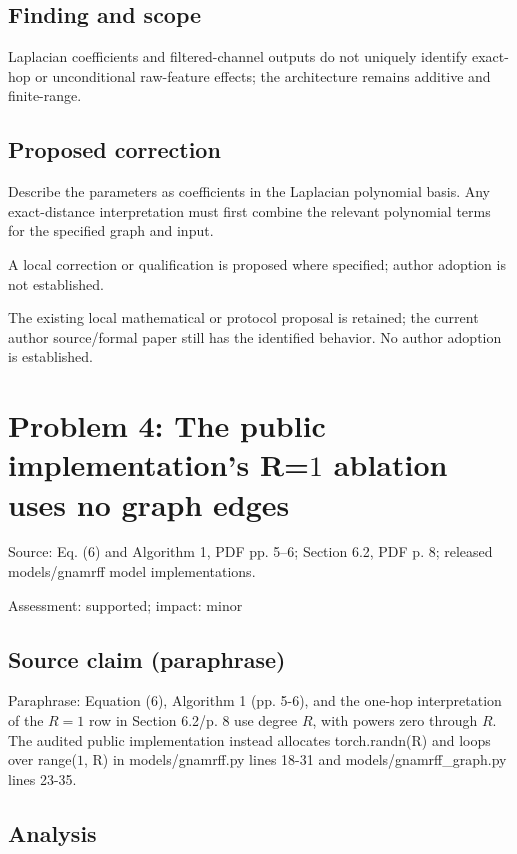 \documentclass[11pt]{article}
\begin{document}
\subsection*{Finding and scope}

Laplacian coefficients and filtered-channel outputs do not uniquely identify exact-hop or unconditional raw-feature effects; the architecture remains additive and finite-range.

\subsection*{Proposed correction}

Describe the parameters as coefficients in the Laplacian polynomial basis. Any exact-distance interpretation must first combine the relevant polynomial terms for the specified graph and input.

A local correction or qualification is proposed where specified; author adoption is not established.

The existing local mathematical or protocol proposal is retained; the current author source/formal paper still has the identified behavior. No author adoption is established.

\section*{Problem 4: The public implementation’s R=\(1\) ablation uses no graph edges}

Source: Eq. (6) and Algorithm 1, PDF pp. 5–6; Section 6.2, PDF p. 8; released models/gnamrff model implementations.

Assessment: supported; impact: minor

\subsection*{Source claim (paraphrase)}

Paraphrase: Equation (6), Algorithm 1 (pp. 5-6), and the one-hop interpretation of the \(R=1\) row in Section 6.2/p. 8 use degree \(R\), with powers zero through \(R\). The audited public implementation instead allocates torch.randn(R) and loops over range(\(1\), R) in models/gnamrff.py lines 18-31 and models/gnamrff\_graph.py lines 23-35.

\subsection*{Analysis}
\end{document}
